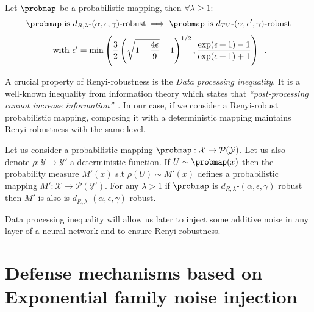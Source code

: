 \begin{proposition} \label{proposition:ap3-RobustTV}
  Let $\probmap$ be a probabilistic mapping, then $\forall\lambda\geq1$:
  \begin{equation}
    \probmap \text{ is }  d_{R,\lambda}\text{-}(\alpha, \epsilon, \gamma)\text{-robust} \implies \probmap \text{ is } d_{TV}\text{-}(\alpha, \epsilon', \gamma)\text{-robust}
  \end{equation}
  \begin{equation}
    \textnormal{ with } \epsilon' = \min \left(\frac{3}{2}\left(\sqrt{1 + \frac{4\epsilon}{9}} - 1\right)^{1/2}, \frac{\exp(\epsilon +1) -1}{\exp(\epsilon +1) +1}\right) \enspace.
  \end{equation}
  \removespace
\end{proposition}

\noindent
A crucial property of Renyi-robustness is the \textit{Data processing inequality}.
It is a well-known inequality from information theory which states that \textit{``post-processing cannot increase information''}~\cite{cover2012elements,beaudry2011intuitive}.
In our case, if we consider a Renyi-robust probabilistic mapping, composing it with a deterministic mapping maintains Renyi-robustness with the same level.

\begin{proposition} \label{proposition:ap3-postprocessing}
  Let us consider a probabilistic mapping $\probmap:\mathcal{X}\rightarrow\mathcal{P}(\mathcal{Y})$. Let us also denote $\rho:\mathcal{Y}\rightarrow\mathcal{Y}'$ a deterministic function.
  If $U \sim \probmap(x)$ then the probability measure $M'(x)$ s.t $\rho(U) \sim M'(x)$ defines a probabilistic mapping $M':\mathcal{X}\rightarrow\mathcal{P}(\mathcal{Y}')$.
  For any $\lambda>1$ if $\probmap$ is $d_{R,\lambda}$-$(\alpha,\epsilon,\gamma)$ robust then $M'$ is also is $d_{R,\lambda}$-$(\alpha,\epsilon,\gamma)$ robust.
\end{proposition}
\noindent
Data processing inequality will allow us later to inject some additive noise in any layer of a neural network and to ensure Renyi-robustness.

\section{Defense mechanisms based on  Exponential family noise injection}
\label{sec:main_result}

